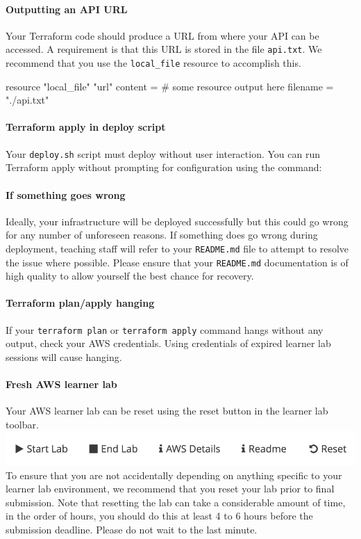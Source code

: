 \documentclass{csse4400}
\begin{document}
\paragraph{Outputting an API URL}
Your Terraform code should produce a URL from where your API can be accessed.
A requirement is that this URL is stored in the file \texttt{api.txt}.
We recommend that you use the \texttt{local\_file} resource to accomplish this.

\begin{code}[language=terraform]{}
resource "local_file" "url" {
    content  = # some resource output here
    filename = "./api.txt"
}
\end{code}


\paragraph{Terraform apply in deploy script}
Your \texttt{deploy.sh} script must deploy without user interaction.
You can run Terraform apply without prompting for configuration using the command:

\paragraph{If something goes wrong}
Ideally, your infrastructure will be deployed successfully but this could go wrong for any number of unforeseen reasons.
If something does go wrong during deployment,
teaching staff will refer to your \texttt{README.md} file to attempt to resolve the issue where possible.
Please ensure that your \texttt{README.md} documentation is of high quality to allow yourself the best chance for recovery.

\paragraph{Terraform plan/apply hanging}
If your \texttt{terraform plan} or \texttt{terraform apply} command hangs without any output,
check your AWS credentials.
Using credentials of expired learner lab sessions will cause hanging.

\paragraph{Fresh AWS learner lab}
Your AWS learner lab can be reset using the reset button in the learner lab toolbar.
\includegraphics[width=\textwidth]{images/reset-button.png}
To ensure that you are not accidentally depending on anything specific to your learner lab environment,
we recommend that you reset your lab prior to final submission.
Note that resetting the lab can take a considerable amount of time,
in the order of hours, you should do this at least 4 to 6 hours before the submission deadline.
Please do not wait to the last minute.
\end{document}
